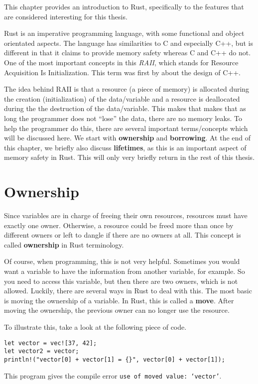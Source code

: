 This chapter provides an introduction to Rust, specifically to the features that are considered interesting for this thesis. 

Rust is an imperative programming language, with some functional and object orientated aspects. The language has similarities to C and especially C++, but is different in that it claims to provide memory safety whereas C and C++ do not. One of the most important concepts in this \emph{RAII}, which stands for Resource Acquisition Is Initialization. This term was first by \cite{stroustrup1994design} about the design of C++.

The idea behind RAII is that a resource (a piece of memory) is allocated during the creation (initialization) of the data/variable and a resource is deallocated during the the destruction of the data/variable. This makes that makes that as long the programmer does not ``lose'' the data, there are no memory leaks. To help the programmer do this, there are several important terms/concepts which will be discussed here. We start with \textbf{ownership} and \textbf{borrowing}. At the end of this chapter, we briefly also discuss \textbf{lifetimes}, as this is an important aspect of memory safety in Rust. This will only very briefly return in the rest of this thesis. 

\section{Ownership} %
Since variables are in charge of freeing their own resources, resources must have exactly one owner. Otherwise, a resource could be freed more than once by different owners or left to dangle if there are no owners at all. This concept is called \textbf{ownership} in Rust terminology. 

Of course, when programming, this is not very helpful. Sometimes you would want a variable to have the information from another variable, for example. So you need to access this variable, but then there are two owners, which is not allowed. Luckily, there are several ways in Rust to deal with this. The most basic is moving the ownership of a variable. In Rust, this is called a \textbf{move}. After moving the ownership, the previous owner can no longer use the resource. 

To illustrate this, take a look at the following piece of code. 
\begin{verbatim}
let vector = vec![37, 42];
let vector2 = vector;
println!("vector[0] + vector[1] = {}", vector[0] + vector[1]);
\end{verbatim}
This program gives the compile error \texttt{use of moved value: `vector'}. 

